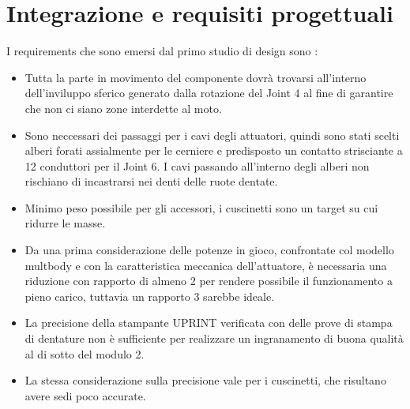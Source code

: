 \documentclass[%
corpo=11pt,
twoside,
 stile=classica,
oldstyle,
greek,%
]{toptesi}
\begin{document}
	\section{Integrazione e requisiti progettuali}
	I requirements che sono emersi dal primo studio di design sono :
	\begin{itemize}
		\item Tutta la parte in movimento del componente dovrà trovarsi all'interno dell'inviluppo sferico generato dalla rotazione del Joint 4 al fine di garantire che non ci siano zone interdette al moto.
		
		\item Sono neccessari dei passaggi per i cavi degli attuatori, quindi sono stati scelti alberi forati assialmente per le cerniere e predisposto un contatto strisciante a 12 conduttori per il Joint 6. I cavi passando all'interno degli alberi non rischiano di incastrarsi nei denti delle ruote dentate. 
		\item Minimo peso possibile per gli accessori, i cuscinetti sono un target su cui ridurre le masse.
		\item Da una prima considerazione delle potenze in gioco, confrontate col modello multbody e con la caratteristica meccanica dell'attuatore, è necessaria una riduzione con rapporto di almeno 2 per rendere possibile il funzionamento a pieno carico, tuttavia un rapporto 3 sarebbe ideale. 
		\item La precisione della stampante UPRINT verificata con delle prove di stampa di dentature non è sufficiente per realizzare un ingranamento di buona qualità al di sotto del modulo 2. 
		\item La stessa considerazione sulla precisione vale per i cuscinetti, che risultano avere sedi poco accurate. 
		
	\end{itemize}
	
	
\end{document}
